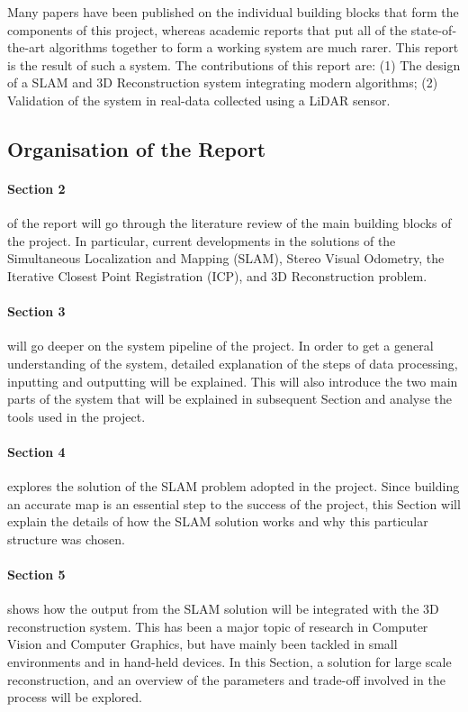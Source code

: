 \documentclass[11pt]{article}
\begin{document}
Many papers have been published on the individual building blocks that form the components of this project, whereas academic reports that put all of the state-of-the-art algorithms together to form a working system are much rarer. This report is the result of such a system. The contributions of this report are: (1) The design of a SLAM and 3D Reconstruction system integrating modern algorithms; (2) Validation of the system in real-data collected using a LiDAR sensor.
	
	\subsection{ Organisation of the Report}

\paragraph{Section 2} of the report will go through the literature review of the main building blocks of the project. In particular, current developments in the solutions of the Simultaneous Localization and Mapping (SLAM), Stereo Visual Odometry, the Iterative Closest Point Registration (ICP), and 3D Reconstruction problem.
	
\paragraph{Section 3} will go deeper on the system pipeline of the project. In order to get a general understanding of the system, detailed explanation of the steps of data processing, inputting and outputting will be explained. This will also introduce the two main parts of the system that will be explained in subsequent Section and analyse the tools used in the project.
		
\paragraph{Section 4} explores the solution of the SLAM problem adopted in the project. Since building an accurate map is an essential step to the success of the project, this Section will explain the details of how the SLAM solution works and why this particular structure was chosen.
		
\paragraph{Section 5} shows how the output from the SLAM solution will be integrated with the 3D reconstruction system. This has been a major topic of research in Computer Vision and Computer Graphics, but have mainly been tackled in small environments and in hand-held devices. In this Section, a solution for large scale reconstruction, and an overview of the parameters and trade-off involved in the process will be explored.
		
\end{document}
